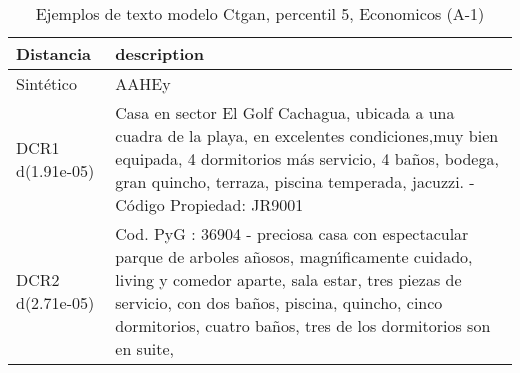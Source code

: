\begin{table}[H]
\centering
\fontsize{10}{14}\selectfont
\caption{Ejemplos de texto modelo Ctgan, percentil 5, Economicos (A-1)}
\label{table-example-economicos-a-1-ctgan-5p-text}
\begin{tabular}{|l|m{35em}|}
\hline
\rowcolor[gray]{0.8}
Distancia & description \\
\hline Sintético & AAHEy \\
\hline DCR1 d(1.91e-05) & Casa en sector El Golf Cachagua, ubicada a una cuadra de la playa, en excelentes condiciones,muy bien equipada, 4 dormitorios m\'as servicio, 4 ba\~nos, bodega, gran quincho, terraza, piscina temperada, jacuzzi. - C\'odigo Propiedad: JR9001 \\
\hline DCR2 d(2.71e-05) & Cod. PyG : 36904 - preciosa casa con espectacular parque de arboles a\~nosos, magn{\'\i}ficamente cuidado, living y comedor aparte, sala estar, tres piezas de servicio, con dos ba\~nos, piscina, quincho, cinco dormitorios, cuatro ba\~nos, tres de los dormitorios son en suite, \\
\hline
\end{tabular}
\end{table}
